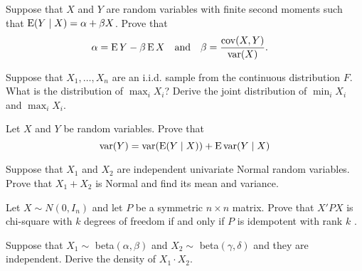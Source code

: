 \begin{hw}
  Suppose that $X$ and $Y$ are random variables with finite second
  moments such that $\operatorname{E}(Y \mid X) = \alpha + \beta X$. Prove that
  \begin{align}
    \alpha &= \operatorname{E} Y - \beta \operatorname{E} X &\text{and}&& \beta &= \frac{\operatorname{cov}(X, Y)}{\operatorname{var}(X)}.
  \end{align}
\end{hw}

\begin{hw}
  Suppose that $X_1,\dots,X_n$ are an i.i.d. sample from the continuous
  distribution $F$. What is the distribution of $\max_i X_i$? Derive
  the joint distribution of $\min_i X_i$ and $\max_i X_i$.
\end{hw}

\begin{hw}
  Let $X$ and $Y$ be random variables. Prove that 
  \begin{equation}
    \operatorname{var}(Y) = \operatorname{var}(\operatorname{E}(Y \mid X)) + \operatorname{E} \operatorname{var}(Y \mid X)
  \end{equation}
\end{hw}

\begin{hw}
  Suppose that $X_1$ and $X_2$ are independent univariate Normal
  random variables. Prove that $X_1 + X_2$ is Normal and find its mean
  and variance.
\end{hw}

\begin{hw}
  Let $X \sim N(0,I_n)$ and let $P$ be a symmetric $n \times n$ matrix.
  Prove that $X'PX$ is chi-square with $k$ degrees of freedom if and
  only if $P$ is idempotent with rank $k$ \citep{SL03}.
\end{hw}

\begin{hw}
  Suppose that $X_1 \sim$ beta$(\alpha, \beta)$ and $X_2 \sim$ beta$(\gamma, \delta)$ and
  they are independent. Derive the density of $X_1 \cdot X_2$.
\end{hw}


